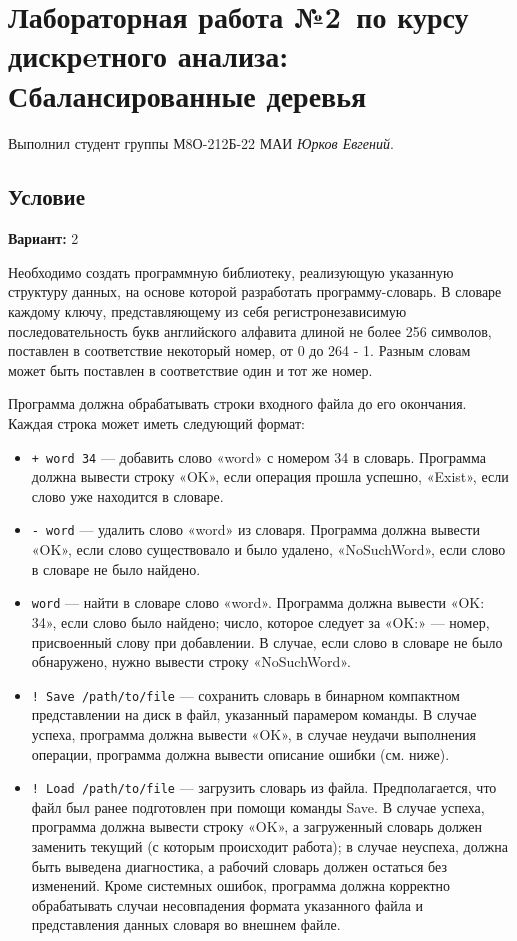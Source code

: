 \documentclass[12pt]{article}
\begin{document}
\section*{Лабораторная работа №2\, по курсу дискрeтного анализа: Сбалансированные деревья}

Выполнил студент группы М8О-212Б-22 МАИ \textit{Юрков Евгений}.

\subsection*{Условие}

\textbf{Вариант:} 2

Необходимо создать программную библиотеку, реализующую указанную структуру данных, на основе которой разработать программу-словарь.
В словаре каждому ключу, представляющему из себя регистронезависимую последовательность букв английского алфавита длиной не более 256 символов,
поставлен в соответствие некоторый номер, от 0 до 264 - 1. Разным словам может быть поставлен в соответствие один и тот же номер.

Программа должна обрабатывать строки входного файла до его окончания. Каждая строка может иметь следующий формат:
\begin{itemize}
    \item \texttt{+ word 34} — добавить слово «word» с номером 34 в словарь. Программа должна вывести строку «OK», если операция прошла успешно,
    «Exist», если слово уже находится в словаре.

    \item \texttt{- word} — удалить слово «word» из словаря. Программа должна вывести «OK», если слово существовало и было удалено,
    «NoSuchWord», если слово в словаре не было найдено.

    \item \texttt{word} — найти в словаре слово «word». Программа должна вывести «OK: 34», если слово было найдено; число, которое следует за «OK:»
    — номер, присвоенный слову при добавлении. В случае, если слово в словаре не было обнаружено, нужно вывести строку «NoSuchWord».

    \item \texttt{! Save /path/to/file} — сохранить словарь в бинарном компактном представлении на диск в файл, указанный парамером команды.
    В случае успеха, программа должна вывести «OK», в случае неудачи выполнения операции, программа должна вывести описание ошибки (см. ниже).

    \item \texttt{! Load /path/to/file} — загрузить словарь из файла. Предполагается, что файл был ранее подготовлен при помощи команды Save. В случае успеха, программа должна вывести строку «OK», а загруженный словарь должен заменить текущий (с которым происходит работа); в случае неуспеха, должна быть выведена диагностика, а рабочий словарь должен остаться без изменений. Кроме системных ошибок, программа должна корректно обрабатывать случаи несовпадения формата указанного файла и представления данных словаря во внешнем файле.
\end{itemize}
\end{document}
